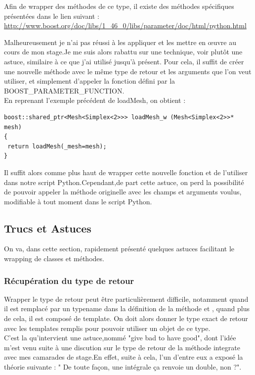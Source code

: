 \documentclass[french,12pt]{article}
\begin{document}
Afin de wrapper des méthodes de ce type, il existe des méthodes spécifiques présentées dans le lien suivant :\\
\url{http://www.boost.org/doc/libs/1_46_0/libs/parameter/doc/html/python.html}
\vspace{0.5 cm}

Malheureusement je n'ai pas réussi à les appliquer et les mettre en œuvre au cours de mon stage.Je me suis alors rabattu sur une technique, voir plutôt une astuce, similaire à ce que j'ai utilisé jusqu'à présent.
Pour cela, il suffit de créer une nouvelle méthode avec le même type de retour et les arguments que l'on veut utiliser, et simplement d'appeler la fonction défini par la BOOST\_PARAMETER\_FUNCTION.\\
En reprenant l'exemple précédent de loadMesh, on obtient :
\begin{lstlisting}
boost::shared_ptr<Mesh<Simplex<2>>> loadMesh_w (Mesh<Simplex<2>>* mesh)
{
 return loadMesh(_mesh=mesh);
}
\end{lstlisting}

Il suffit alors comme plus haut de wrapper cette nouvelle fonction et de l'utiliser dans notre script Python.Cependant,de part cette astuce, on perd la possibilité de pouvoir appeler la méthode originelle avec les champs et arguments voulus, modifiable à tout moment dans le script Python.

\subsection{Trucs et Astuces}
On va, dans cette section, rapidement présenté quelques astuces facilitant le wrapping de classes et méthodes.
\subsubsection{Récupération du type de retour}
Wrapper le type de retour peut être particulièrement difficile, notamment quand il est remplacé par un typename dans la définition de la méthode et , quand plus de cela, il est composé de template. On doit alors donner le type exact de retour avec les templates remplis pour pouvoir utiliser un objet de ce type.\\

C'est la qu'intervient une astuce,nommé "give bad to have good", dont l'idée m'est venu suite à une discution sur le type de retour de la méthode integrate avec mes camarades de stage.En effet, suite à cela, l'un d'entre eux a exposé la théorie suivante : " De toute façon, une intégrale ça renvoie un double, non ?".\\
\end{document}
